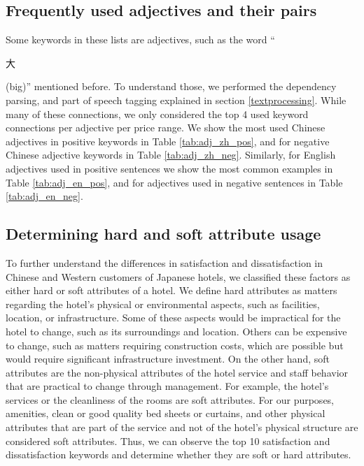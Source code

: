 \documentclass[smallextended,natbib]{svjour3}       %
\begin{document}
  \subsection{Frequently used adjectives and their pairs}\label{adjresults}

    Some keywords in these lists are adjectives, such as the word ``\begin{CJK}{UTF8}{gbsn}大\end{CJK} (big)'' mentioned before. To understand those, we performed the dependency parsing, and part of speech tagging explained in section \ref{textprocessing}. While many of these connections, we only considered the top 4 used keyword connections per adjective per price range. We show the most used Chinese adjectives in positive keywords in Table \ref{tab:adj_zh_pos}, and for negative Chinese adjective keywords in Table \ref{tab:adj_zh_neg}. Similarly, for English adjectives used in positive sentences we show the most common examples in Table \ref{tab:adj_en_pos}, and for adjectives used in negative sentences in Table \ref{tab:adj_en_neg}.

  \subsection{Determining hard and soft attribute usage}\label{det_hard_soft}

    To further understand the differences in satisfaction and dissatisfaction in Chinese and Western customers of Japanese hotels, we classified these factors as either hard or soft attributes of a hotel. We define hard attributes as matters regarding the hotel's physical or environmental aspects, such as facilities, location, or infrastructure. Some of these aspects would be impractical for the hotel to change, such as its surroundings and location. Others can be expensive to change, such as matters requiring construction costs, which are possible but would require significant infrastructure investment. On the other hand, soft attributes are the non-physical attributes of the hotel service and staff behavior that are practical to change through management. For example, the hotel's services or the cleanliness of the rooms are soft attributes. For our purposes, amenities, clean or good quality bed sheets or curtains, and other physical attributes that are part of the service and not of the hotel's physical structure are considered soft attributes. Thus, we can observe the top 10 satisfaction and dissatisfaction keywords and determine whether they are soft or hard attributes.
\end{document}
